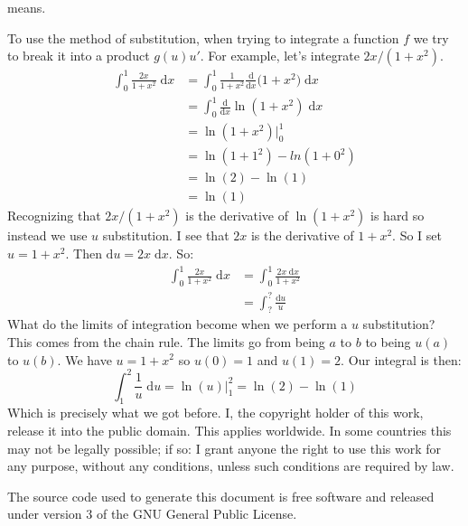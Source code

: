 \documentclass{article}
\begin{document}
    means.
    \par\hfill\par
    To use the method of substitution, when trying to integrate a function
    $f$ we try to break it into a product $g(u)u'$. For example, let's
    integrate $2x/(1+x^{2})$.
    \begin{align}
        \int_{0}^{1}\frac{2x}{1+x^{2}}\;\textrm{d}x
            &=\int_{0}^{1}\frac{1}{1+x^{2}}\frac{\textrm{d}}{\textrm{d}x}
                \big(1+x^{2}\big)\;\textrm{d}x\\
            &=\int_{0}^{1}\frac{\textrm{d}}{\textrm{d}x}
                \ln(1+x^{2})\;\textrm{d}x\\
            &=\ln(1+x^{2})\big|_{0}^{1}\\
            &=\ln(1+1^{2})-ln(1+0^{2})\\
            &=\ln(2)-\ln(1)\\
            &=\ln(1)
    \end{align}
    Recognizing that $2x/(1+x^{2})$ is the derivative of $\ln(1+x^{2})$ is hard
    so instead we use $u$ substitution. I see that
    $2x$ is the derivative of $1+x^{2}$. So I set $u=1+x^{2}$. Then
    $\textrm{d}u=2x\;\textrm{d}x$. So:
    \begin{align}
        \int_{0}^{1}\frac{2x}{1+x^{2}}\;\textrm{d}x
            &=\int_{0}^{1}\frac{2x\;\textrm{d}x}{1+x^{2}}\\
            &=\int_{?}^{?}\frac{\textrm{d}u}{u}
    \end{align}
    What do the limits of integration become when we perform a $u$ substitution?
    This comes from the chain rule. The limits go from being $a$ to $b$ to
    being $u(a)$ to $u(b)$. We have $u=1+x^{2}$ so $u(0)=1$ and $u(1)=2$.
    Our integral is then:
    \begin{equation}
        \int_{1}^{2}\frac{1}{u}\;\textrm{d}u=\ln(u)\big|_{1}^{2}
            =\ln(2)-\ln(1)
    \end{equation}
    Which is precisely what we got before.
    \newpage
    I, the copyright holder of this work, release it into the public domain.
    This applies worldwide. In some countries this may not be legally possible;
    if so: I grant anyone the right to use this work for any purpose, without
    any conditions, unless such conditions are required by law.
    \par\hfill\par
    The source code used to generate this document is free software and released
    under version 3 of the GNU General Public License.
\end{document}
